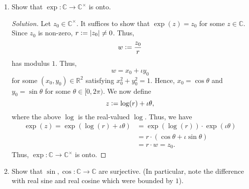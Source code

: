 \documentclass[11pt]{article}
\theoremstyle{definition}
\newenvironment{soln}{\begin{proof}[Solution]}{\end{proof}}
\begin{document}
\begin{enumerate}[leftmargin=*]
\begin{soln}
    Although the above theorem is for analytic functions, we shall show later in the course that holomorphic functions are indeed analytic. Since the set $K$ is bounded, there exists $M > 0$ such that 
    \[
        \abs{z} \leq M \text{ for all } z \in K.
    \]
    Choosing the point $z_0 = M + 2$, we see that $f$ vanishes in a neighbourhood of radius $1$ around $z_0$. Since $\mathbb{C}$ is open and path-connected (and hence a domain), and since any open disc is not discrete, we conclude from the above theorem that $f$ must be identically zero on $\mathbb{C}$.
    \end{soln}
    
    \item Show that $\exp \colon \mathbb{C} \to \mathbb{C}^{\times}$ is onto.
    
    \begin{soln}
    Let $z_0 \in \mathbb{C}^{\times}$. It suffices to show that $\exp(z) = z_0$ for some $z \in \mathbb{C}$. Since $z_0$ is non-zero, $r \vcentcolon= \abs{z_0} \neq 0$. Thus, 
    \[
        w \vcentcolon= \frac{z_0}{r}
    \]
    has modulus $1$. Thus, 
    \[
        w = x_0 + \iota y_0
    \]
    for some $(x_0, y_0) \in \mathbb{R}^2$ satisfying $x_0^2 + y_0^2 = 1$. Hence, $x_0 = \cos \theta$ and $y_0 = \sin \theta$ for some $\theta \in [0, 2\pi)$. We now define 
    \[
        z \vcentcolon= \log(r) + \iota \theta,
    \]
    where the above $\log$ is the real-valued $\log$. Thus, we have
    \begin{align*}
        \exp(z) = \exp(\log(r) + \iota \theta) &= \exp(\log(r)) \cdot \exp(\iota \theta) \\
        &= r \cdot (\cos\theta + \iota \sin \theta) \\
        &= r \cdot w = z_0.
    \end{align*}
    Thus, $\exp \colon \mathbb{C} \to \mathbb{C}^{\times}$ is onto.
    \end{soln}
    
    \item Show that $\sin, \cos \colon \mathbb{C} \to \mathbb{C}$ are surjective. (In particular, note the difference with real sine and real cosine which were bounded by $1$).
    

\end{enumerate}
\end{document}
